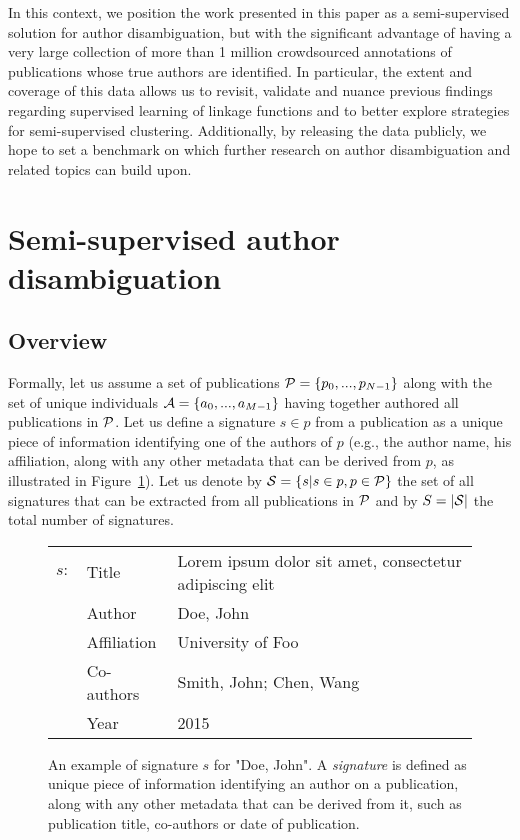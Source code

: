 \documentclass{article}
\begin{document}
In this context, we position the work presented in this paper as a
semi-supervised  solution for author disambiguation, but with the significant
advantage of having a very large collection of more than 1 million crowdsourced annotations
of publications whose true authors are identified. In particular, the extent and coverage
of this data allows us to revisit, validate and nuance previous findings regarding
supervised learning of linkage functions and to better explore strategies
for semi-supervised clustering. Additionally, by releasing the data publicly,
we hope to set a benchmark on which further research on author disambiguation
and related topics can  build upon.




\section{Semi-supervised author disambiguation}
\label{methods}

\subsection{Overview}

Formally, let us assume a set of publications ${\cal P} = \{ p_0, ...,
p_{N-1}\}$ along with the set of unique individuals ${\cal A} = \{ a_0, ...,
a_{M-1}\}$ having together authored all publications in ${\cal P}$.  Let us
define a signature $s \in p$ from a publication as a unique piece of
information identifying one of the authors of $p$ (e.g., the author name, his
affiliation, along with any other metadata that can be derived from $p$, as illustrated in Figure~\ref{fig:signature}). Let us
denote by ${\cal S} = \{ s | s \in p, p \in {\cal P} \}$ the set of all
signatures that can be extracted from all publications in ${\cal P}$ and
by $S=|{\cal S}|$ the total number of signatures.

\begin{figure}
\label{fig:signature}
\begin{tabular}{ l l l }
  $s:$ & Title & Lorem ipsum dolor sit amet, consectetur adipiscing elit \\
  & Author & Doe, John \\
  & Affiliation & University of Foo \\
  & Co-authors & Smith, John; Chen, Wang\\
  & Year & 2015\\
\end{tabular}

\caption{An example of signature $s$ for "Doe, John". A \textit{signature} is
defined as unique piece of information identifying an author on a publication,
along with any other metadata that can be derived from it, such as publication
title, co-authors or date of publication.}
\end{figure}
\end{document}

